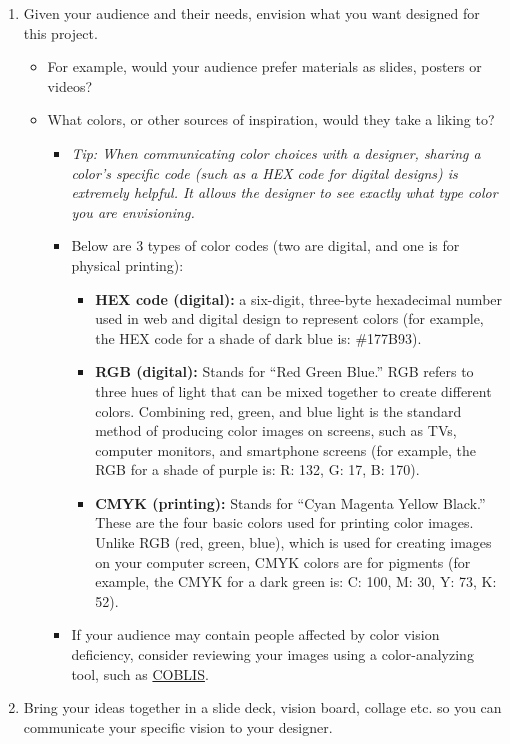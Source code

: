 \documentclass[
]{book}
\providecommand{\tightlist}{%
  \setlength{\itemsep}{0pt}\setlength{\parskip}{0pt}}
\begin{document}
\begin{enumerate}
\def\labelenumi{\arabic{enumi}.}
\tightlist
\item
  Given your audience and their needs, envision what you want designed for this project.

  \begin{itemize}
  \tightlist
  \item
    For example, would your audience prefer materials as slides, posters or videos?
  \item
    What colors, or other sources of inspiration, would they take a liking to?

    \begin{itemize}
    \tightlist
    \item
      \emph{Tip: When communicating color choices with a designer, sharing a color's specific code (such as a HEX code for digital designs) is extremely helpful. It allows the designer to see exactly what type color you are envisioning. }
    \item
      Below are 3 types of color codes (two are digital, and one is for physical printing):

      \begin{itemize}
      \tightlist
      \item
        \textbf{HEX code (digital):} a six-digit, three-byte hexadecimal number used in web and digital design to represent colors (for example, the HEX code for a shade of dark blue is: \#177B93).
      \item
        \textbf{RGB (digital):} Stands for ``Red Green Blue.'' RGB refers to three hues of light that can be mixed together to create different colors. Combining red, green, and blue light is the standard method of producing color images on screens, such as TVs, computer monitors, and smartphone screens (for example, the RGB for a shade of purple is: R: 132, G: 17, B: 170).
      \item
        \textbf{CMYK (printing):} Stands for ``Cyan Magenta Yellow Black.'' These are the four basic colors used for printing color images. Unlike RGB (red, green, blue), which is used for creating images on your computer screen, CMYK colors are for pigments (for example, the CMYK for a dark green is: C: 100, M: 30, Y: 73, K: 52).
      \end{itemize}
    \item
      If your audience may contain people affected by color vision deficiency, consider reviewing your images using a color-analyzing tool, such as \href{https://www.color-blindness.com/coblis-color-blindness-simulator/}{COBLIS}.
    \end{itemize}
  \end{itemize}
\item
  Bring your ideas together in a slide deck, vision board, collage etc. so you can communicate your specific vision to your designer.
\end{enumerate}
\end{document}
